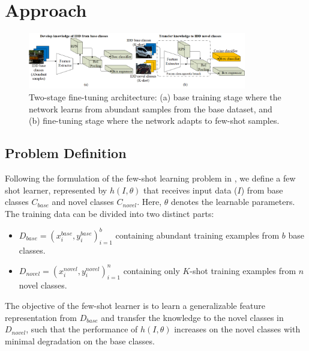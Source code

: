 \documentclass[letterpaper]{article} %
\begin{document}
\section{Approach}
\label{approach}
\begin{figure}[t]
      \centering
      \includegraphics[width=0.85\textwidth]{two_stage_finetune}
      \caption{Two-stage fine-tuning architecture: (a) base training stage where the network learns from abundant samples from the base dataset, and (b) fine-tuning stage where the network adapts to few-shot samples.}
      \label{fig_tfa}
\end{figure}

\subsection{Problem Definition}
\label{approach:prob_def}
Following the formulation of the few-shot learning problem in \cite{reweight,metarcnn}, we define a few shot learner, represented by $h(I,\theta)$ that receives input data ($I$) from base classes $C_{base}$ and novel classes $C_{novel}$. Here, $\theta$ denotes the learnable parameters. The training data can be divided into two distinct parts:
\begin{itemize}
      \item $D_{base} = {(x_{i}^{base}, y_{i}^{base})}_{i=1}^{b}$ containing abundant training examples from $b$ base classes.
      \item $D_{novel} = {(x_{i}^{novel}, y_{i}^{novel})}_{i=1}^{n}$ containing only $K$-shot training examples from $n$ novel classes.
\end{itemize}
The objective of the few-shot learner is to learn a generalizable feature representation from $D_{base}$ and transfer the knowledge to the novel classes in $D_{novel}$, such that the performance of $h(I,\theta)$ increases on the novel classes with minimal degradation on the base classes. 
\end{document}
